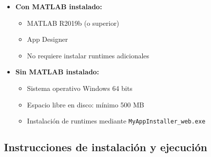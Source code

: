 \begin{itemize}
    \item \textbf{Con MATLAB instalado:}
    \begin{itemize}
        \item MATLAB R2019b (o superior)
        \item App Designer
        \item No requiere instalar runtimes adicionales
    \end{itemize}

    \item \textbf{Sin MATLAB instalado:}
    \begin{itemize}
        \item Sistema operativo Windows 64 bits
        \item Espacio libre en disco: mínimo 500 MB
        \item Instalación de runtimes mediante \texttt{MyAppInstaller\_web.exe}
    \end{itemize}
\end{itemize}

\subsection*{Instrucciones de instalación y ejecución}

